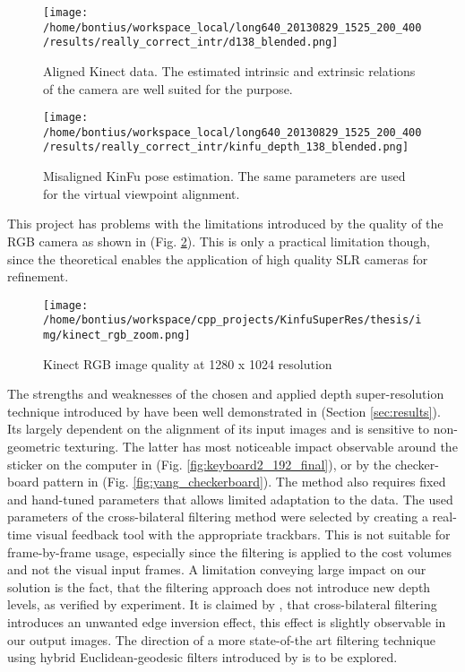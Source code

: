 \documentclass{ucl_thesis}
\newcommand{\figref}[1]{(Fig. \ref{#1})}
\newcommand{\secref}[1]{(Section \ref{#1})}
\begin{document}
\begin{figure}[h!]\centering
	\begin{minipage}[b]{0.49\linewidth}
		\texttt{[image: /home/bontius/workspace\_local/long640\_20130829\_1525\_200\_400/results/really\_correct\_intr/d138\_blended.png]}
		\caption{Aligned Kinect data. The estimated intrinsic and extrinsic relations of the camera are well suited for the purpose.}
	\end{minipage}
	\begin{minipage}[b]{0.49\linewidth}
		\texttt{[image: /home/bontius/workspace\_local/long640\_20130829\_1525\_200\_400/results/really\_correct\_intr/kinfu\_depth\_138\_blended.png]}
		\caption{Misaligned KinFu pose estimation. The same parameters are used for the virtual viewpoint alignment.}
		\label{fig:limit_kinfu_pose}
	\end{minipage}
\end{figure}

This project has problems with the limitations introduced by the quality of the RGB camera as shown in \figref{fig:kinect_rgb_zoom}. This is only a practical limitation though, since the theoretical enables the application of high quality SLR cameras for refinement.

\begin{figure}[h!]\centering
        \texttt{[image: /home/bontius/workspace/cpp\_projects/KinfuSuperRes/thesis/img/kinect\_rgb\_zoom.png]}
        \caption{Kinect RGB image quality at 1280 x 1024 resolution}
        \label{fig:kinect_rgb_zoom}
\end{figure}

\par The strengths and weaknesses of the chosen and applied depth super-resolution technique introduced by \citep{cvpr-07-qingxiong-yang} have been well demonstrated in \secref{sec:results}. Its largely dependent on the alignment of its input images and is sensitive to non-geometric texturing. The latter has most noticeable impact observable around the sticker on the computer in \figref{fig:keyboard2_192_final}, or by the checker-board pattern in  \figref{fig:yang_checkerboard}. The method also requires fixed and hand-tuned parameters that allows limited adaptation to the data. The used parameters of the cross-bilateral filtering method were selected by creating a real-time visual feedback tool with the appropriate trackbars. This is not suitable for frame-by-frame usage, especially since the filtering is applied to the cost volumes and not the visual input frames. A limitation conveying large impact on our solution is the fact, that the filtering approach does not introduce new depth levels, as verified by experiment.
It is claimed by \citep{guided_filter}, that cross-bilateral filtering introduces an unwanted edge inversion effect, this effect is slightly observable in our output images. The direction of a more state-of-the art filtering technique using hybrid Euclidean-geodesic filters introduced by \citep{Gastal:2012} is to be explored.
    
\end{document}
